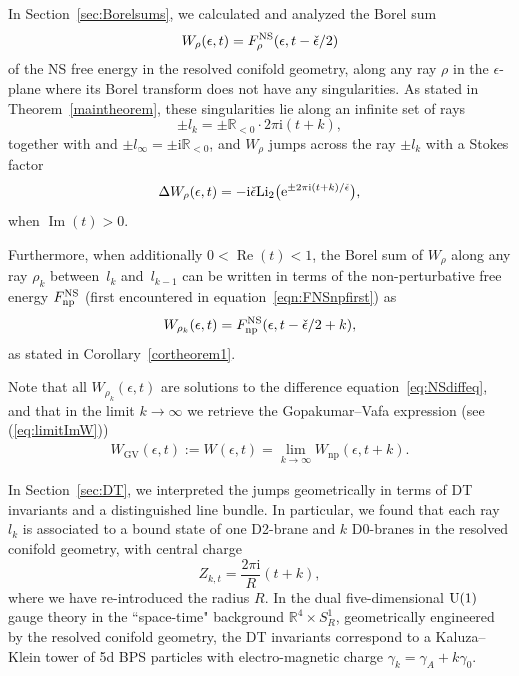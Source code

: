 \documentclass[pdftex]{sigma}
\numberwithin{equation}{section}
\begin{document}
In Section~\ref{sec:Borelsums}, we calculated and analyzed the Borel sum
\begin{equation*}
W_\rho(\epsilon,t) = F_\rho^{\rm NS}(\epsilon, t - \check{\epsilon}/2)
\end{equation*}
of the NS free energy in the resolved conifold geometry, along any ray $\rho$ in the $\epsilon$-plane where its Borel transform does not have any singularities. As stated in Theorem~\ref{maintheorem}, these singularities lie along an infinite set of rays
\begin{equation*}
\pm l_k = \pm \mathbb{R}_{< 0} \cdot 2 \pi \mathrm{i} (t+k),
\end{equation*}
together with and $\pm l_\infty = \pm \mathrm{i} \mathbb{R}_{< 0}$, and $W_\rho$ jumps across the ray $\pm l_k$ with a Stokes factor{\samepage
\begin{equation*}
\Delta W_\rho(\epsilon,t) = -\mathrm{i}\check{\epsilon} \mathrm{Li}_2\big({\rm e}^{\pm 2\pi \mathrm{i}(t + k)/\check \epsilon}\big),
\end{equation*}
when $\operatorname{Im}(t)>0$.}

Furthermore, when additionally $0 < \operatorname{Re}(t) <1$, the Borel sum of $W_\rho$ along any ray $\rho_k$ between~$l_k$ and~$l_{k-1}$ can be written in terms of the non-perturbative free energy $F_{\rm np}^{\rm NS}$ (first encountered in equation~\eqref{eqn:FNSnpfirst}) as
\begin{equation*}
 W_{\rho_k}(\epsilon,t) = F_{\rm np}^{\rm NS}(\epsilon, t - \check{\epsilon}/2 + k),
\end{equation*}
as stated in Corollary~\ref{cortheorem1}.

Note that all $W_{\rho_k}(\epsilon,t)$ are solutions to the difference equation~\eqref{eq:NSdiffeq}, and that in the limit $k \to \infty$ we retrieve the Gopakumar--Vafa expression (see (\ref{eq:limitImW}))
\begin{align*}
 W_\mathrm{GV}(\epsilon,t) := W(\epsilon,t) = \lim_{k \to \infty} W_\mathrm{np}(\epsilon,t+k).
\end{align*}

In Section~\ref{sec:DT}, we interpreted the jumps geometrically in terms of DT invariants and a distinguished line bundle. In particular, we found that each ray $l_k$ is associated to a bound state of one D2-brane and $k$ D0-branes in the resolved conifold geometry, with central charge
\begin{equation*}
Z_{k,t} = \frac{2 \pi \mathrm{i}}{R} (t+k),
\end{equation*}
where we have re-introduced the radius $R$. In the dual five-dimensional ${\rm U}(1)$ gauge theory in the ``space-time" background $\mathbb{R}^4 \times S^1_R$, geometrically engineered by the resolved conifold geometry, the DT invariants correspond to a Kaluza--Klein tower of 5d BPS particles with electro-magnetic charge $\gamma_k = \gamma_A + k \gamma_0$.
\end{document}
